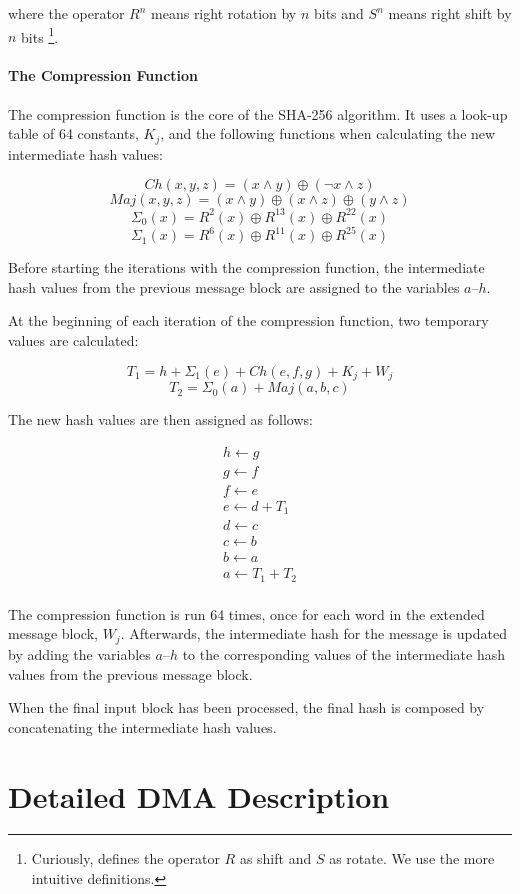 \begin{appendix}
\noindent where the operator $R^n$ means right rotation by $n$ bits and $S^n$ means right shift by $n$
bits \footnote{Curiously, \cite{sha-spec} defines the operator $R$ as shift and $S$ as rotate.
We use the more intuitive definitions.}.

\subsubsection{The Compression Function}
\label{sec:sha-compr}
The compression function is the core of the SHA-256 algorithm. It uses a look-up table
of 64 constants, $K_j$, and the following functions when calculating the new intermediate
hash values:

\[Ch(x,y,z) = (x \wedge y) \oplus (\neg x \wedge z)\]
\[Maj(x, y, z) = (x \wedge y) \oplus (x \wedge z) \oplus (y \wedge z)\]
\[\Sigma_0(x) = R^2(x) \oplus R^{13}(x) \oplus R^{22}(x)\]
\[\Sigma_1(x) = R^6(x) \oplus R^{11}(x) \oplus R^{25}(x)\]

Before starting the iterations with the compression function, the intermediate
hash values from the previous message block are assigned to the variables $a$--$h$.

At the beginning of each iteration of the compression function, two temporary
values are calculated:

\[T_1 = h + \Sigma_1(e) + Ch(e, f, g) + K_j + W_j\]
\[T_2 = \Sigma_0(a) + Maj(a, b, c)\]

The new hash values are then assigned as follows:

\[\begin{array}{l}
	h \leftarrow g \\
	g \leftarrow f \\
	f \leftarrow e \\
	e \leftarrow d + T_1\\
	d \leftarrow c \\
	c \leftarrow b \\
	b \leftarrow a \\
	a \leftarrow T_1 + T_2 \\
\end{array}\]

The compression function is run 64 times, once for each word in the extended message block,
$W_j$. Afterwards, the intermediate hash for the message is updated by adding the
variables $a$--$h$ to the corresponding values of the intermediate hash values from
the previous message block.

When the final input block has been processed, the final hash is composed by
concatenating the intermediate hash values. \cite{sha-spec, fips180-4, fordypningsprosjekt}

\chapter{Detailed DMA Description}
\label{app:DMA-arch}


\end{appendix}

